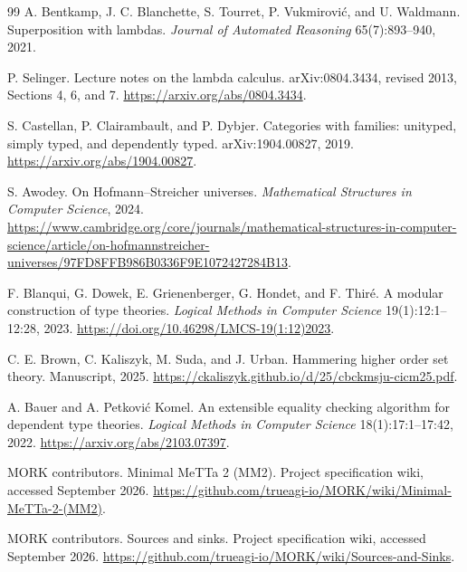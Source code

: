\documentclass[11pt]{article}
\theoremstyle{definition}
\theoremstyle{remark}
\begin{document}
\begin{thebibliography}{99}
A. Bentkamp, J. C. Blanchette, S. Tourret, P. Vukmirovi\'c, and U. Waldmann.
\newblock Superposition with lambdas.
\newblock \emph{Journal of Automated Reasoning} 65(7):893--940, 2021.

P. Selinger.
\newblock Lecture notes on the lambda calculus.
\newblock arXiv:0804.3434, revised 2013, Sections 4, 6, and 7.
\newblock \url{https://arxiv.org/abs/0804.3434}.

S. Castellan, P. Clairambault, and P. Dybjer.
\newblock Categories with families: unityped, simply typed, and dependently typed.
\newblock arXiv:1904.00827, 2019.
\newblock \url{https://arxiv.org/abs/1904.00827}.

S. Awodey.
\newblock On Hofmann--Streicher universes.
\newblock \emph{Mathematical Structures in Computer Science}, 2024.
\newblock \url{https://www.cambridge.org/core/journals/mathematical-structures-in-computer-science/article/on-hofmannstreicher-universes/97FD8FFB986B0336F9E1072427284B13}.

F. Blanqui, G. Dowek, E. Grienenberger, G. Hondet, and F. Thir\'e.
\newblock A modular construction of type theories.
\newblock \emph{Logical Methods in Computer Science} 19(1):12:1--12:28, 2023.
\newblock \url{https://doi.org/10.46298/LMCS-19(1:12)2023}.

C. E. Brown, C. Kaliszyk, M. Suda, and J. Urban.
\newblock Hammering higher order set theory.
\newblock Manuscript, 2025.
\newblock \url{https://ckaliszyk.github.io/d/25/cbckmsju-cicm25.pdf}.

A. Bauer and A. Petkovi\'c Komel.
\newblock An extensible equality checking algorithm for dependent type theories.
\newblock \emph{Logical Methods in Computer Science} 18(1):17:1--17:42, 2022.
\newblock \url{https://arxiv.org/abs/2103.07397}.

MORK contributors.
\newblock Minimal MeTTa 2 (MM2).
\newblock Project specification wiki, accessed September 2026.
\newblock \url{https://github.com/trueagi-io/MORK/wiki/Minimal-MeTTa-2-(MM2)}.

MORK contributors.
\newblock Sources and sinks.
\newblock Project specification wiki, accessed September 2026.
\newblock \url{https://github.com/trueagi-io/MORK/wiki/Sources-and-Sinks}.


\end{thebibliography}
\end{document}
